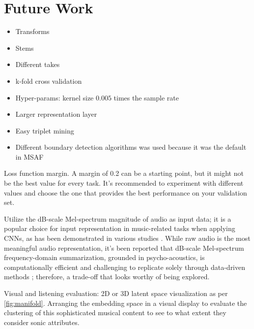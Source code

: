 \chapter{Future Work}

\begin{itemize}
  \item Transforms
  \item Stems
  \item Different takes
  \item k-fold cross validation
  \item Hyper-params: kernel size $0.005$ times the sample rate
  \item Larger representation layer
  \item Easy triplet mining \cite{XuanImprovedMining}
  \item Different boundary detection algorithms \cite{sf} was used because it was the default in MSAF \cite{MSAF}
\end{itemize}

Loss function margin. A margin of 0.2 can be a starting point, but it might not be the best value for every task. It's recommended to experiment with different values and choose the one that provides the best performance on your validation set.

Utilize the dB-scale Mel-spectrum magnitude of audio as input data; it is a popular choice for input representation in music-related tasks when applying CNNs, as has been demonstrated in various studies \cite{Kim2020OneStrategies}. While raw audio is the most meaningful audio representation, it's been reported that dB-scale Mel-spectrum frequency-domain summarization, grounded in psycho-acoustics, is computationally efficient and challenging to replicate solely through data-driven methods \cite{Kim2020OneStrategies}; therefore, a trade-off that looks worthy of being explored.

Visual and listening evaluation: 2D or 3D latent space visualization as per \ref{fig:manifold}. Arranging the embedding space in a visual display to evaluate the clustering of this sophisticated musical content to see to what extent they consider sonic attributes. 



\newpage